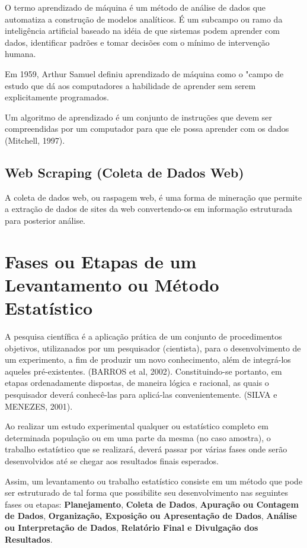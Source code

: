O termo aprendizado de máquina é um método de análise de dados que automatiza a construção de modelos analíticos. É um subcampo ou ramo da inteligência artificial baseado na idéia de que sistemas podem aprender com dados, identificar padrões e tomar decisões com o mínimo de intervenção humana.\vskip0.3cm

Em 1959, Arthur Samuel definiu aprendizado de máquina como o "campo de estudo que dá aos computadores a habilidade de aprender sem serem explicitamente programados.\vskip0.3cm

Um algoritmo de aprendizado é um conjunto de instruções que devem ser compreendidas
por um computador para que ele possa aprender com os dados (Mitchell, 1997).



\subsection{Web Scraping (Coleta de Dados Web)}

A coleta de dados web, ou raspagem web, é uma forma de mineração que permite a extração de dados de sites da web convertendo-os em informação estruturada para posterior análise.


\section{Fases ou Etapas de um Levantamento ou Método Estatístico}

\inic A pesquisa científica é a aplicação prática de um conjunto de procedimentos objetivos, utilizanados por um pesquisador (cientista), para o desenvolvimento de um experimento, a fim de produzir um novo conhecimento, além de integrá-los aqueles pré-existentes. (BARROS et al, 2002). Constituindo-se portanto, em etapas ordenadamente dispostas, de maneira lógica e racional, as quais o pesquisador deverá conhecê-las para aplicá-las convenientemente. (SILVA e MENEZES, 2001). 
\vskip0.3cm


Ao realizar um estudo experimental qualquer ou estatístico completo em determinada população ou em uma parte da mesma (no caso amostra), o trabalho estatístico que se realizará, deverá passar por várias fases onde serão desenvolvidos até se chegar aos resultados finais esperados.\vskip0.3cm

Assim, um levantamento ou trabalho estatístico consiste em um
método que pode ser estruturado de tal forma que possibilite seu
desenvolvimento nas seguintes fases ou etapas:
\textbf{Planejamento}, \textbf{Coleta de Dados}, \textbf{Apuração
ou Contagem de Dados}, \textbf{Organização, Exposição ou
Apresentação de Dados}, \textbf{Análise ou Interpretação de
Dados}, \textbf{Relatório Final e Divulgação dos Resultados}.


